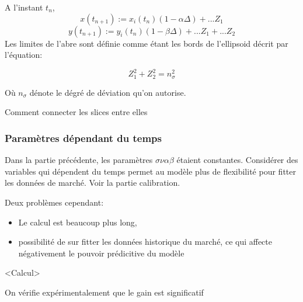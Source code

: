 A l'instant $t_n$,
$$x(t_{n+1}) := x_i(t_n) (1 - \alpha \Delta) + ... Z_1$$
$$y(t_{n+1}) := y_i(t_n) (1 - \beta \Delta) + ... Z_1 + ...Z_2$$
Les limites de l'abre sont définie comme étant les bords de l'ellipsoid décrit par l'équation:

$$Z_1^2 + Z_2^2 = n_{\sigma}^2$$

Où $n_{\sigma}$ dénote le dégré de déviation qu'on autorise.

Comment connecter les slices entre elles


\subsubsection{ Paramètres dépendant du temps}

Dans la partie précédente, les paramètres $\sigma \nu \alpha \beta$ étaient constantes. Considérer des variables qui dépendent  du temps permet au modèle plus de flexibilité pour fitter les données de marché. Voir la partie calibration.

Deux problèmes cependant:

\begin{itemize}
\item Le calcul est beaucoup plus long,
\item possibilité de sur fitter les données historique du marché, ce qui affecte négativement le pouvoir prédicitive du modèle
\end{itemize}

<Calcul>

On vérifie expérimentalement que le gain est significatif


